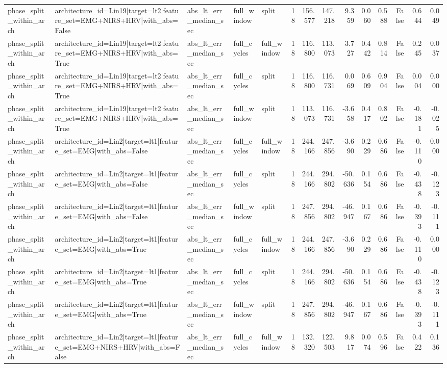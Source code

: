 \begin{table}
\begin{tabular}{lllllrrrrrrrrr}
phase_split_within_arch & architecture_id=Lin19|target=lt2|feature_set=EMG+NIRS+HRV|with_abs=False & abs_lt_err_median_sec & full_window & split & 18 & 156.577 & 147.218 & 9.359 & 0.060 & 0.588 & False & 0.644 & 0.049 \\
phase_split_within_arch & architecture_id=Lin19|target=lt2|feature_set=EMG+NIRS+HRV|with_abs=True & abs_lt_err_median_sec & full_cycles & full_window & 18 & 116.800 & 113.073 & 3.727 & 0.442 & 0.814 & False & 0.245 & 0.037 \\
phase_split_within_arch & architecture_id=Lin19|target=lt2|feature_set=EMG+NIRS+HRV|with_abs=True & abs_lt_err_median_sec & full_cycles & split & 18 & 116.800 & 116.731 & 0.069 & 0.609 & 0.904 & False & 0.004 & 0.000 \\
phase_split_within_arch & architecture_id=Lin19|target=lt2|feature_set=EMG+NIRS+HRV|with_abs=True & abs_lt_err_median_sec & full_window & split & 18 & 113.073 & 116.731 & -3.658 & 0.417 & 0.802 & False & -0.181 & -0.025 \\
phase_split_within_arch & architecture_id=Lin2|target=lt1|feature_set=EMG|with_abs=False & abs_lt_err_median_sec & full_cycles & full_window & 18 & 244.166 & 247.856 & -3.690 & 0.229 & 0.686 & False & -0.110 & 0.000 \\
phase_split_within_arch & architecture_id=Lin2|target=lt1|feature_set=EMG|with_abs=False & abs_lt_err_median_sec & full_cycles & split & 18 & 244.166 & 294.802 & -50.636 & 0.154 & 0.686 & False & -0.438 & -0.123 \\
phase_split_within_arch & architecture_id=Lin2|target=lt1|feature_set=EMG|with_abs=False & abs_lt_err_median_sec & full_window & split & 18 & 247.856 & 294.802 & -46.947 & 0.167 & 0.686 & False & -0.393 & -0.111 \\
phase_split_within_arch & architecture_id=Lin2|target=lt1|feature_set=EMG|with_abs=True & abs_lt_err_median_sec & full_cycles & full_window & 18 & 244.166 & 247.856 & -3.690 & 0.229 & 0.686 & False & -0.110 & 0.000 \\
phase_split_within_arch & architecture_id=Lin2|target=lt1|feature_set=EMG|with_abs=True & abs_lt_err_median_sec & full_cycles & split & 18 & 244.166 & 294.802 & -50.636 & 0.154 & 0.686 & False & -0.438 & -0.123 \\
phase_split_within_arch & architecture_id=Lin2|target=lt1|feature_set=EMG|with_abs=True & abs_lt_err_median_sec & full_window & split & 18 & 247.856 & 294.802 & -46.947 & 0.167 & 0.686 & False & -0.393 & -0.111 \\
phase_split_within_arch & architecture_id=Lin2|target=lt1|feature_set=EMG+NIRS+HRV|with_abs=False & abs_lt_err_median_sec & full_cycles & full_window & 18 & 132.320 & 122.503 & 9.817 & 0.074 & 0.596 & False & 0.422 & 0.136 \\

\end{tabular}
\end{table}
